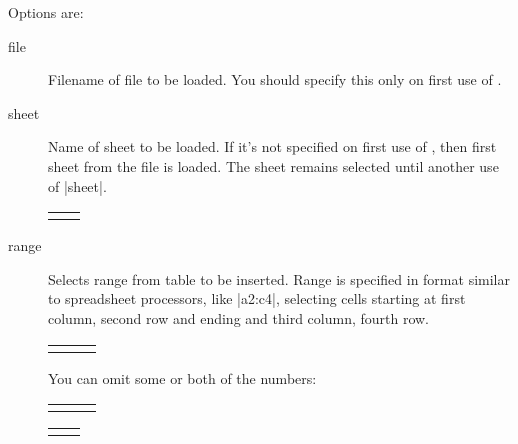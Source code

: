 \documentclass{ltxdoc}
\begin{document}
Options are:

\begin{description}
\item[file] Filename of file to be loaded. You should specify this only on first use of .
\item[sheet] Name of sheet to be loaded. If it's not specified on first use of , then first sheet from the file is loaded. The sheet remains selected until another use of |sheet|.
\begin{LTXexample}
\begin{tabular}{l l}
\end{tabular}     
\end{LTXexample}
\item[range] Selects range from table to be inserted. Range is specified in format similar to spreadsheet processors, like |a2:c4|, selecting cells starting at first column, second row and ending and third column, fourth row.
\begin{LTXexample}
\begin{tabular}{lll}
\end{tabular}     
\end{LTXexample}
You can omit some or both of the numbers:
\begin{LTXexample}
\begin{tabular}{lll}
\end{tabular}     
\end{LTXexample}

\begin{LTXexample}
\begin{tabular}{ll}
\end{tabular}     
\end{LTXexample}
  

\end{description}
\end{document}

